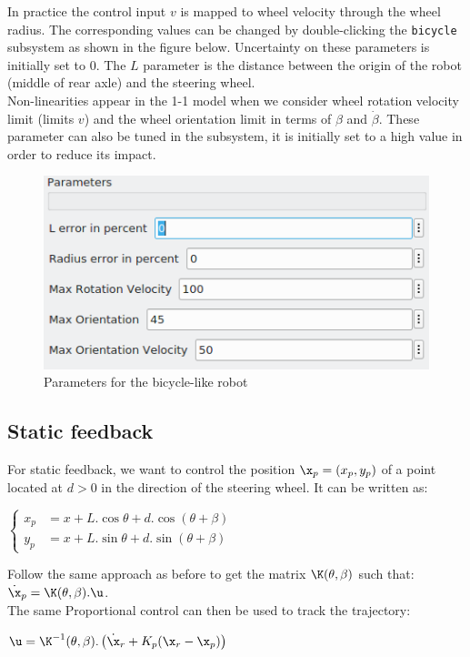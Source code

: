 \documentclass{ecnreport}
\begin{document}
In practice the control input $v$ is mapped to wheel velocity through the wheel radius. The corresponding values can be changed by double-clicking the \texttt{bicycle} subsystem as shown in the figure below. Uncertainty on these parameters is initially set to 0. The $L$ parameter is the distance between the origin of the robot (middle of rear axle) and the steering wheel.  \\

Non-linearities appear in the 1-1 model when we consider wheel rotation velocity limit (limits $v$) and the wheel orientation limit in terms of $\beta$ and $\dot \beta$. These parameter can also be tuned in the subsystem, it is initially set to a high value in order to reduce its impact.

\begin{figure}[ht]
\centering
\includegraphics[width=0.4\linewidth]{param11}
\caption{Parameters for the bicycle-like robot}
\end{figure}

\subsection{Static feedback}

For static feedback, we want to control the position $\x_p = (x_p,y_p)$ of a point located at $d > 0$ in the direction of the steering wheel.
It can be written as: 
\begin{center}
 $\left\{\begin{array}{ll}
         x_p &= x + L.\cos\theta + d.\cos(\theta+\beta) \\
         y_p &= x + L.\sin\theta  + d.\sin(\theta+\beta)
        \end{array}\right.$
\end{center}
Follow the same approach as before to get the matrix $\K(\theta, \beta)$ such that: $\dot \x_p = \K(\theta, \beta).\u$.
\\

The same Proportional control can then be used to track the trajectory:
\begin{center}
$\u = \K^{-1}(\theta, \beta) .\left(\dot \x_r + K_p(\x_r - \x_p)\right)$
\end{center}
\end{document}
